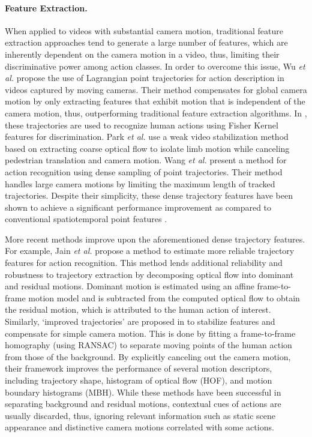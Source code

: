 \documentclass[runningheads]{llncs}
\begin{document}
\paragraph{Feature Extraction.} When applied to videos with substantial camera motion, traditional feature extraction approaches \cite{dollar2005, laptev2005} tend to generate a large number of features, which are inherently dependent on the camera motion in a video, thus, limiting their discriminative power among action classes. In order to overcome this issue, Wu \emph{et al.} \cite{wu2011} propose the use of Lagrangian point trajectories for action description in videos captured  by moving cameras. Their method compensates for global camera motion by only extracting features that exhibit motion that is independent of the camera motion, thus, outperforming traditional feature extraction algorithms. In \cite{GhanemICPR2012}, these trajectories are used to recognize human actions using Fisher Kernel features for discrimination. Park \emph{et al.} \cite{park2013} use a weak video stabilization method based on extracting coarse optical flow to isolate limb motion while canceling pedestrian translation and camera motion. Wang \emph{et al.} \cite{wang2011} present a method for action recognition using dense sampling of point trajectories. Their method handles large camera motions by limiting the maximum length of tracked trajectories. Despite their simplicity, these dense trajectory features have been shown to achieve a significant performance improvement as compared to conventional spatiotemporal point features \cite{laptev2005}.

More recent methods improve upon the aforementioned dense trajectory features. For example, Jain \emph{et al.} \cite{jain2013} propose a method to estimate more reliable trajectory features for action recognition. This method lends additional reliability and robustness to trajectory extraction by decomposing optical flow into dominant and residual motions. Dominant motion is estimated using an affine frame-to-frame motion model and is subtracted from the computed optical flow to obtain the residual motion, which is attributed to the human action of interest. Similarly, `improved trajectories' are proposed in \cite{wang2013} to stabilize features and compensate for simple camera motion. This is done by fitting a frame-to-frame homography (using RANSAC) to separate moving points of the human action from those of the background. By explicitly canceling out the camera motion, their framework improves the performance of several motion descriptors, including trajectory shape, histogram of optical flow (HOF), and motion boundary histograms (MBH). While these methods have been successful in separating background and residual motions, contextual cues of actions are usually discarded, thus, ignoring relevant information such as static scene appearance and distinctive camera motions correlated with some actions.
\end{document}
